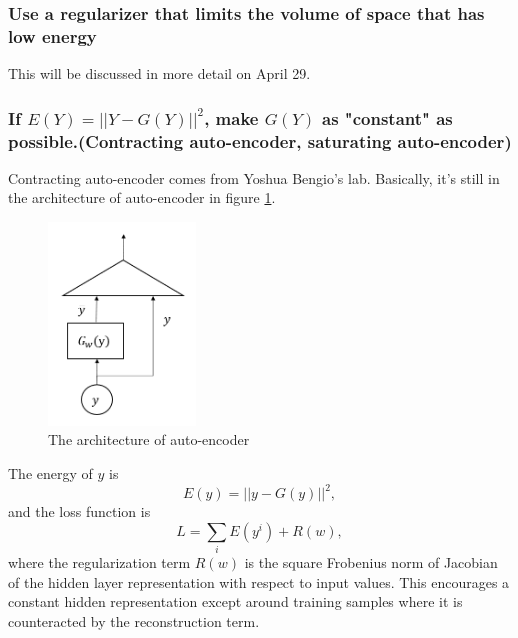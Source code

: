 \subsubsection{Use a regularizer that limits the volume of space that has low energy}
This will be discussed in more detail on April 29.
    
\subsubsection{If $E(Y) = ||Y - G(Y)||^2$, make $G(Y)$ as "constant" as possible.(Contracting auto-encoder, saturating auto-encoder)}

Contracting auto-encoder comes from Yoshua Bengio's lab. Basically, it's still in the architecture of auto-encoder in figure  \ref{figure5}.

\begin{figure}[htb]
    \centering
    \includegraphics[width=0.35\textwidth]{figs/PIC5.PNG}
    \caption{The architecture of auto-encoder}
    \label{figure5}
\end{figure}

The energy of $y$ is $$ E(y) = ||y-G(y)||^2, $$ and the loss function is $$L = \sum_i E(y^i)+R(w),$$ where the regularization term $R(w)$ is the square Frobenius norm of Jacobian of the hidden layer representation with respect to input values. 
This encourages a constant hidden representation except around training samples where it is counteracted by the reconstruction term.
